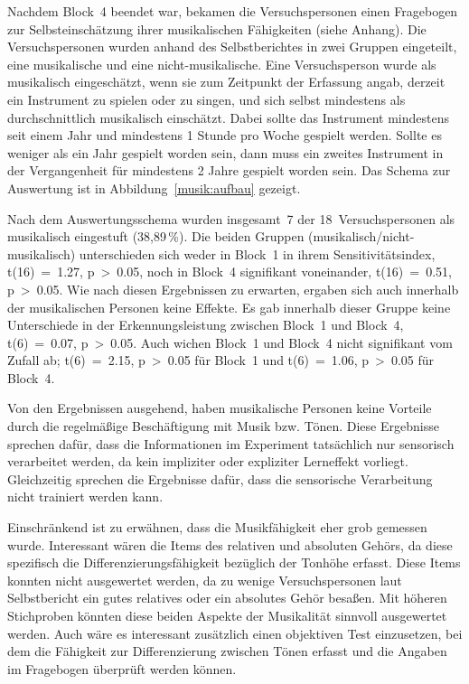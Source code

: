\documentclass[doc,a4paper,12pt]{apa6}
\begin{document}
Nachdem Block~4 beendet war, bekamen die Versuchspersonen einen Fragebogen zur Selbsteinschätzung ihrer musikalischen Fähigkeiten (siehe Anhang). Die Versuchspersonen wurden anhand des Selbstberichtes in zwei Gruppen eingeteilt, eine musikalische und eine nicht-musikalische. Eine Versuchsperson wurde als musikalisch eingeschätzt, wenn sie zum Zeitpunkt der Erfassung angab, derzeit ein Instrument zu spielen oder zu singen, und sich selbst mindestens als durchschnittlich musikalisch einschätzt. Dabei sollte das Instrument mindestens seit einem Jahr und mindestens 1 Stunde pro Woche gespielt werden. Sollte es weniger als ein Jahr gespielt worden sein, dann muss ein zweites Instrument in der Vergangenheit für mindestens 2 Jahre gespielt worden sein. Das Schema zur Auswertung ist in Abbildung~\ref{musik:aufbau} gezeigt.

Nach dem Auswertungsschema wurden insgesamt~7 der 18~Versuchspersonen als musikalisch eingestuft (38,89\,\%). Die beiden Gruppen (musikalisch/nicht-musikalisch) unterschieden sich weder in Block~1 in ihrem Sensitivitätsindex, t(16)~=~1.27, p~>~0.05, noch in Block~4 signifikant voneinander, t(16)~=~0.51, p~>~0.05. Wie nach diesen Ergebnissen zu erwarten, ergaben sich auch innerhalb der musikalischen Personen keine Effekte. Es gab innerhalb dieser Gruppe keine Unterschiede in der Erkennungsleistung zwischen Block~1 und Block~4, t(6)~=~0.07, p~>~0.05. Auch wichen Block~1 und Block~4 nicht signifikant vom Zufall ab; t(6)~=~2.15, p~>~0.05 für Block~1 und t(6)~=~1.06, p~>~0.05 für Block~4.

Von den Ergebnissen ausgehend, haben musikalische Personen keine Vorteile durch die regelmäßige Beschäftigung mit Musik bzw. Tönen. Diese Ergebnisse sprechen dafür, dass die Informationen im Experiment tatsächlich nur sensorisch verarbeitet werden, da kein impliziter oder expliziter Lerneffekt vorliegt. Gleichzeitig sprechen die Ergebnisse dafür, dass die sensorische Verarbeitung nicht trainiert werden kann.

Einschränkend ist zu erwähnen, dass die Musikfähigkeit eher grob gemessen wurde. Interessant wären die Items des relativen und absoluten Gehörs, da diese spezifisch die Differenzierungsfähigkeit bezüglich der Tonhöhe erfasst. Diese Items konnten nicht ausgewertet werden, da zu wenige Versuchspersonen laut Selbstbericht ein gutes relatives oder ein absolutes Gehör besaßen. Mit höheren Stichproben könnten diese beiden Aspekte der Musikalität sinnvoll ausgewertet werden. Auch wäre es interessant zusätzlich einen objektiven Test einzusetzen, bei dem die Fähigkeit zur Differenzierung zwischen Tönen erfasst und die Angaben im Fragebogen überprüft werden können.
\end{document}
